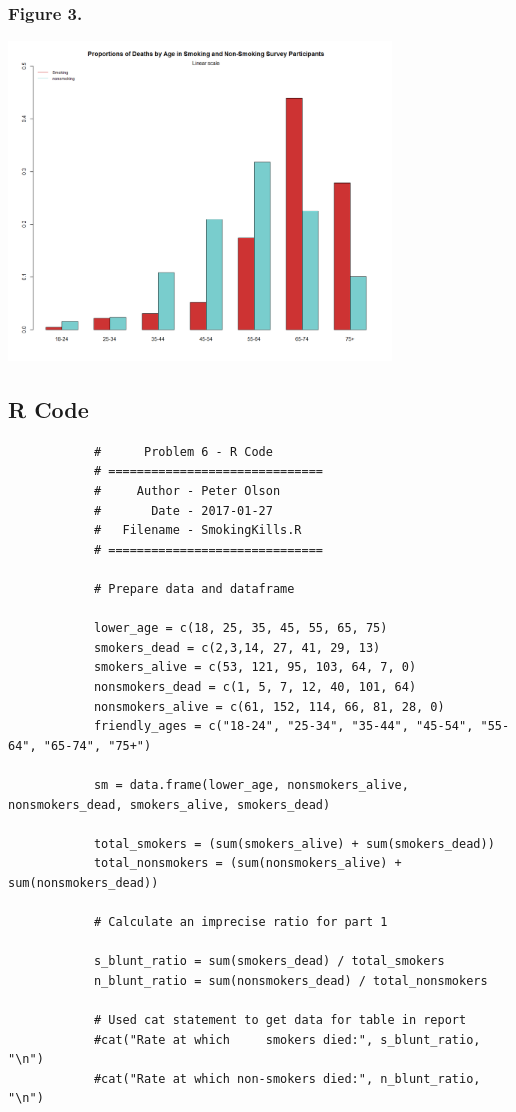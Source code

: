 \documentclass{article}
\begin{document}
\begin{enumerate}[\ \ (a)\ ]
		\subsubsection*{Figure 3.}
		\includegraphics[width=4in]{P3.png}
		\subsection*{R Code}
		\begin{verbatim}
			#      Problem 6 - R Code
			# ==============================
			#     Author - Peter Olson
			#       Date - 2017-01-27
			#   Filename - SmokingKills.R
			# ==============================
			
			# Prepare data and dataframe
			
			lower_age = c(18, 25, 35, 45, 55, 65, 75)
			smokers_dead = c(2,3,14, 27, 41, 29, 13)
			smokers_alive = c(53, 121, 95, 103, 64, 7, 0)
			nonsmokers_dead = c(1, 5, 7, 12, 40, 101, 64)
			nonsmokers_alive = c(61, 152, 114, 66, 81, 28, 0)
			friendly_ages = c("18-24", "25-34", "35-44", "45-54", "55-64", "65-74", "75+")
			
			sm = data.frame(lower_age, nonsmokers_alive, nonsmokers_dead, smokers_alive, smokers_dead)
			
			total_smokers = (sum(smokers_alive) + sum(smokers_dead))
			total_nonsmokers = (sum(nonsmokers_alive) + sum(nonsmokers_dead))
			
			# Calculate an imprecise ratio for part 1
			
			s_blunt_ratio = sum(smokers_dead) / total_smokers
			n_blunt_ratio = sum(nonsmokers_dead) / total_nonsmokers
			
			# Used cat statement to get data for table in report
			#cat("Rate at which     smokers died:", s_blunt_ratio, "\n")
			#cat("Rate at which non-smokers died:", n_blunt_ratio, "\n")
			

\end{verbatim}
\end{enumerate}
\end{document}
